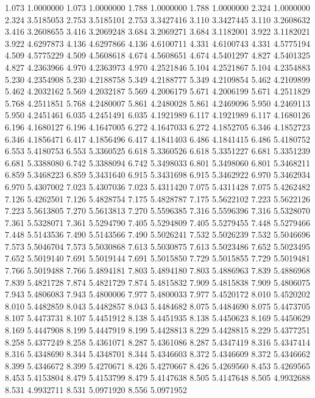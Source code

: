1.073 1.0000000
1.073 1.0000000
1.788 1.0000000
1.788 1.0000000
2.324 1.0000000
2.324 3.5185053
2.753 3.5185101
2.753 3.3427416
3.110 3.3427445
3.110 3.2608632
3.416 3.2608655
3.416 3.2069248
3.684 3.2069271
3.684 3.1182001
3.922 3.1182021
3.922 4.6297873
4.136 4.6297866
4.136 4.6100711
4.331 4.6100743
4.331 4.5775194
4.509 4.5775229
4.509 4.5608618
4.674 4.5608651
4.674 4.5401297
4.827 4.5401325
4.827 4.2363966
4.970 4.2363973
4.970 4.2521846
5.104 4.2521867
5.104 4.2354883
5.230 4.2354908
5.230 4.2188758
5.349 4.2188777
5.349 4.2109854
5.462 4.2109899
5.462 4.2032162
5.569 4.2032187
5.569 4.2006179
5.671 4.2006199
5.671 4.2511829
5.768 4.2511851
5.768 4.2480007
5.861 4.2480028
5.861 4.2469096
5.950 4.2469113
5.950 4.2451461
6.035 4.2451491
6.035 4.1921989
6.117 4.1921989
6.117 4.1680126
6.196 4.1680127
6.196 4.1647005
6.272 4.1647033
6.272 4.1852705
6.346 4.1852723
6.346 4.1856471
6.417 4.1856496
6.417 4.1841403
6.486 4.1841415
6.486 5.4180752
6.553 5.4180753
6.553 5.3360525
6.618 5.3360526
6.618 5.3351227
6.681 5.3351239
6.681 5.3388080
6.742 5.3388094
6.742 5.3498033
6.801 5.3498060
6.801 5.3468211
6.859 5.3468223
6.859 5.3431640
6.915 5.3431698
6.915 5.3462922
6.970 5.3462934
6.970 5.4307002
7.023 5.4307036
7.023 5.4311420
7.075 5.4311428
7.075 5.4262482
7.126 5.4262501
7.126 5.4828754
7.175 5.4828787
7.175 5.5622102
7.223 5.5622126
7.223 5.5613805
7.270 5.5613813
7.270 5.5596385
7.316 5.5596396
7.316 5.5328070
7.361 5.5328071
7.361 5.5294790
7.405 5.5294809
7.405 5.5279455
7.448 5.5279466
7.448 5.5143536
7.490 5.5143566
7.490 5.5026241
7.532 5.5026239
7.532 5.5046696
7.573 5.5046704
7.573 5.5030868
7.613 5.5030875
7.613 5.5023486
7.652 5.5023495
7.652 5.5019140
7.691 5.5019144
7.691 5.5015850
7.729 5.5015855
7.729 5.5019481
7.766 5.5019488
7.766 5.4894181
7.803 5.4894180
7.803 5.4886963
7.839 5.4886968
7.839 5.4821728
7.874 5.4821729
7.874 5.4815832
7.909 5.4815838
7.909 5.4806075
7.943 5.4806083
7.943 5.4800006
7.977 5.4800033
7.977 5.4520172
8.010 5.4520202
8.010 5.4482859
8.043 5.4482857
8.043 5.4484682
8.075 5.4484690
8.075 5.4473705
8.107 5.4473731
8.107 5.4451912
8.138 5.4451935
8.138 5.4450623
8.169 5.4450629
8.169 5.4447908
8.199 5.4447919
8.199 5.4428813
8.229 5.4428815
8.229 5.4377251
8.258 5.4377249
8.258 5.4361071
8.287 5.4361086
8.287 5.4347419
8.316 5.4347414
8.316 5.4348690
8.344 5.4348701
8.344 5.4346603
8.372 5.4346609
8.372 5.4346662
8.399 5.4346672
8.399 5.4270671
8.426 5.4270667
8.426 5.4269560
8.453 5.4269565
8.453 5.4153804
8.479 5.4153799
8.479 5.4147638
8.505 5.4147648
8.505 4.9932688
8.531 4.9932711
8.531 5.0971920
8.556 5.0971952
